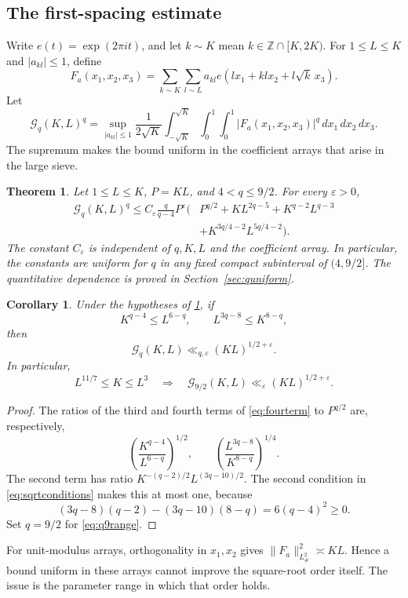 \documentclass[11pt,reqno]{amsart}
\numberwithin{equation}{section}
\newtheorem{theorem}{Theorem}[section]
\newtheorem{corollary}[corollary]{Corollary}
\theoremstyle{definition}
\theoremstyle{remark}
\newcommand{\Z}{\mathbb Z}
\newcommand{\eps}{\varepsilon}
\newcommand{\Gq}{\mathcal G_q}
\newcommand{\Gnine}{\mathcal G_{9/2}}
\begin{document}
\subsection{The first-spacing estimate}
Write $e(t)=\exp(2\pi it)$, and let $k\sim K$ mean $k\in\Z\cap[K,2K)$.
For $1\le L\le K$ and $|a_{kl}|\le1$, define
\begin{equation}\label{eq:Fa}
 F_a(x_1,x_2,x_3)=\sum_{k\sim K}\sum_{l\sim L}
 a_{kl}e(lx_1+klx_2+l\sqrt{k}\,x_3).
\end{equation}
Let
\begin{equation}\label{eq:Gq}
 \Gq(K,L)^q=\sup_{|a_{kl}|\le1}
 \frac1{2\sqrt K}\int_{-\sqrt K}^{\sqrt K}\int_0^1\int_0^1
 |F_a(x_1,x_2,x_3)|^q\,dx_1\,dx_2\,dx_3.
\end{equation}
The supremum makes the bound uniform in the coefficient arrays that arise in the large sieve.

\begin{theorem}\label{thm:first}
Let $1\le L\le K$, $P=KL$, and $4<q\le9/2$. For every $\eps>0$,
\begin{equation}\label{eq:fourterm}
 \begin{aligned}
 \Gq(K,L)^q\le C_\eps\frac{q}{q-4}P^\eps
 \bigl(&P^{q/2}+KL^{2q-5}+K^{q-2}L^{q-3}\\
       &+K^{3q/4-2}L^{5q/4-2}\bigr).
 \end{aligned}
\end{equation}
The constant $C_\eps$ is independent of $q,K,L$ and the coefficient array. In particular, the constants are uniform for $q$ in any fixed compact subinterval of $(4,9/2]$. The quantitative dependence is proved in Section~\ref{sec:quniform}.
\end{theorem}

\begin{corollary}\label{cor:sqrt}
Under the hypotheses of \cref{thm:first}, if
\begin{equation}\label{eq:sqrtconditions}
 K^{q-4}\le L^{6-q},\qquad L^{3q-8}\le K^{8-q},
\end{equation}
then
\begin{equation}\label{eq:sqrtbound}
 \Gq(K,L)\ll_{q,\eps}(KL)^{1/2+\eps}.
\end{equation}
In particular,
\begin{equation}\label{eq:q9range}
 L^{11/7}\le K\le L^3
 \quad\Longrightarrow\quad
 \Gnine(K,L)\ll_\eps(KL)^{1/2+\eps}.
\end{equation}
\end{corollary}
\begin{proof}
The ratios of the third and fourth terms of \eqref{eq:fourterm} to $P^{q/2}$ are, respectively,
\[
 \left(\frac{K^{q-4}}{L^{6-q}}\right)^{1/2},
 \qquad
 \left(\frac{L^{3q-8}}{K^{8-q}}\right)^{1/4}.
\]
The second term has ratio $K^{-(q-2)/2}L^{(3q-10)/2}$.
The second condition in \eqref{eq:sqrtconditions} makes this at most one, because
\[
 (3q-8)(q-2)-(3q-10)(8-q)=6(q-4)^2\ge0.
\]
Set $q=9/2$ for \eqref{eq:q9range}.
\end{proof}
For unit-modulus arrays, orthogonality in $x_1,x_2$ gives $\|F_a\|_{L^2_\#}^2\asymp KL$.
Hence a bound uniform in these arrays cannot improve the square-root order itself. The issue is the parameter range in which that order holds.
\end{document}
